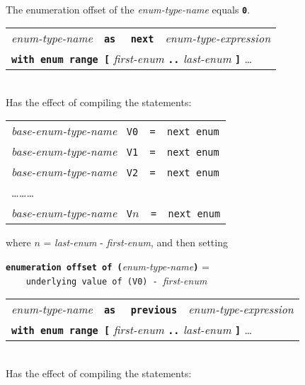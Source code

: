\documentclass[12pt]{article}
\newcommand{\TT}[1]{{\tt \bfseries #1}}
\newcommand{\STAR}{{\Large $^\star$}}
\newenvironment{indpar}[1][0.3in]%
	{\begin{list}{}%
		     {\setlength{\itemsep}{0in}%
		      \setlength{\topsep}{0in}%
		      \setlength{\parsep}{1ex}%
		      \setlength{\labelwidth}{#1}%
		      \setlength{\leftmargin}{#1}%
		      \addtolength{\leftmargin}{\labelsep}}%
	 \item}%
	{\end{list}}
\newenvironment{itemlist}[1][0.5in]%
	{\begin{list}{}{\setlength{\labelwidth}{#1}%
	                \setlength{\leftmargin}{#1}%
		        \addtolength{\leftmargin}{\labelsep}}}%
	{\end{list}}
\begin{document}
\begin{indpar}
\begin{itemlist}
\item[\TT{define type} {\em qualifier-name}\STAR{} {\em enum-type-name}~~%
    \TT{as}~~{\em integer-type-expression} \ldots{}] ~\\
The enumeration offset of the {\em enum-type-name} equals \TT{0}.
\item[\TT{define type} {\em qualifier-name}\STAR{}]
              \begin{tabular}[t]{@{}l@{}}
              {\em enum-type-name}~~\TT{as}~~%
              \TT{next}~~{\em enum-type-expression} \\
	      \TT{with enum range [}
	         {\em first-enum} \TT{..} {\em last-enum} \TT{]} \ldots{} \\
	      \end{tabular} \\
Has the effect of compiling the statements:
\begin{center}
\begin{tabular}{l}
{\em base-enum-type-name} {\tt ~V0~~=~~next enum} \\
{\em base-enum-type-name} {\tt ~V1~~=~~next enum} \\
{\em base-enum-type-name} {\tt ~V2~~=~~next enum} \\
\ldots\ldots\ldots \\
{\em base-enum-type-name} {\tt ~V$n$~~=~~next enum} \\
\end{tabular}
\end{center}
where $n$ = {\em last-enum} - {\em first-enum}, and then setting
\begin{center}
\TT{enumeration offset of (}{\em enum-type-name}\TT{)} = \\
{\tt ~~~~underlying value of (V0)~-~}{\em first-enum}
\end{center}
\item[\TT{define type} {\em qualifier-name}\STAR{}]
              \begin{tabular}[t]{@{}l@{}}
              {\em enum-type-name}~~\TT{as}~~%
              \TT{previous}~~{\em enum-type-expression} \\
	      \TT{with enum range [}
	         {\em first-enum} \TT{..} {\em last-enum} \TT{]} \ldots{} \\
	      \end{tabular} \\
Has the effect of compiling the statements:
\begin{center}

\end{center}
\end{itemlist}
\end{indpar}
\end{document}
